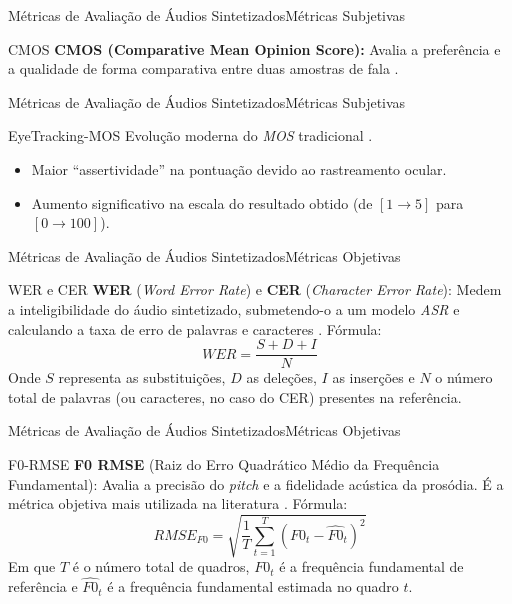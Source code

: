 \begin{frame}{Métricas de Avaliação de Áudios Sintetizados}{Métricas Subjetivas}
  \begin{block}{CMOS}
    \textbf{CMOS (Comparative Mean Opinion Score):} Avalia a preferência e a qualidade de
    forma comparativa entre duas amostras de fala \cite{prosody_eval_julio}.
  \end{block}
\end{frame}

\begin{frame}{Métricas de Avaliação de Áudios Sintetizados}{Métricas Subjetivas}
  \begin{block}{EyeTracking-MOS}
    Evolução moderna do \textit{MOS} tradicional \cite{EyetrackingMOS}.
    \begin{itemize}
      \item Maior ``assertividade'' na pontuação devido ao rastreamento ocular.
      \item Aumento significativo na escala do resultado obtido (de $[1 \to 5]$
        para $[0 \to 100]$).
    \end{itemize}
  \end{block}
\end{frame}

\begin{frame}{Métricas de Avaliação de Áudios Sintetizados}{Métricas Objetivas}
  \begin{block}{WER e CER}
    \textbf{WER} (\textit{Word Error Rate}) e \textbf{CER} (\textit{Character Error
    Rate}): Medem a inteligibilidade do áudio sintetizado, submetendo-o a um modelo
    \textit{ASR} e calculando a taxa de erro de palavras e caracteres
    \cite{lang_processing_book}. Fórmula:
    $$WER = \frac{S + D + I}{N}$$
    Onde $S$ representa as substituições, $D$ as deleções, $I$ as inserções e $N$ o
    número total de palavras (ou caracteres, no caso do CER) presentes na referência.
  \end{block}
\end{frame}

\begin{frame}{Métricas de Avaliação de Áudios Sintetizados}{Métricas Objetivas}
  \begin{block}{F0-RMSE}
    \textbf{F0 RMSE} (Raiz do Erro Quadrático Médio da Frequência Fundamental): Avalia a
    precisão do \textit{pitch} e a fidelidade acústica da prosódia. É a métrica objetiva
    mais utilizada na literatura \cite{prosody_eval_julio}. Fórmula:
    $$RMSE_{F0} = \sqrt{\frac{1}{T} \sum_{t=1}^{T} (F0_t - \hat{F0}_t)^2}$$
    Em que $T$ é o número total de quadros, $F0_t$ é a frequência fundamental de
    referência e $\hat{F0}_t$ é a frequência fundamental estimada no quadro $t$.
  \end{block}
\end{frame}

